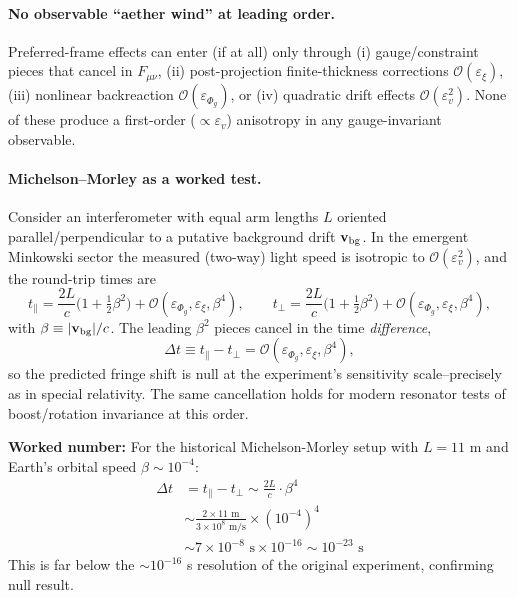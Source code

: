 \paragraph{No observable ``aether wind'' at leading order.}
Preferred-frame effects can enter (if at all) only through (i) gauge/constraint pieces that cancel in $F_{\mu\nu}$, (ii) post-projection finite-thickness corrections $\mathcal O(\varepsilon_\xi)$, (iii) nonlinear backreaction $\mathcal O(\varepsilon_{\Phi_g})$, or (iv) quadratic drift effects $\mathcal O(\varepsilon_v^2)$. None of these produce a first-order ($\propto \varepsilon_v$) anisotropy in any gauge-invariant observable.

\paragraph{Michelson–Morley as a worked test.}
Consider an interferometer with equal arm lengths $L$ oriented parallel/perpendicular to a putative background drift $\mathbf v_{\rm bg}$. In the emergent Minkowski sector the measured (two-way) light speed is isotropic to $\mathcal O(\varepsilon_v^2)$, and the round-trip times are
\begin{equation}
t_{\parallel}=\frac{2L}{c}\Big(1+\tfrac{1}{2}\beta^2\Big)+\mathcal O(\varepsilon_{\Phi_g},\varepsilon_\xi,\beta^4),\qquad
t_{\perp}=\frac{2L}{c}\Big(1+\tfrac{1}{2}\beta^2\Big)+\mathcal O(\varepsilon_{\Phi_g},\varepsilon_\xi,\beta^4),
\end{equation}
with $\beta\equiv|\mathbf v_{\rm bg}|/c$. The leading $\beta^2$ pieces cancel in the time \emph{difference},
\begin{equation}
\Delta t \equiv t_{\parallel}-t_{\perp}=\mathcal O(\varepsilon_{\Phi_g},\varepsilon_\xi,\beta^4),
\end{equation}
so the predicted fringe shift is null at the experiment's sensitivity scale--precisely as in special relativity. The same cancellation holds for modern resonator tests of boost/rotation invariance at this order.

\textbf{Worked number:} For the historical Michelson-Morley setup with $L = 11$ m and Earth's orbital speed $\beta \sim 10^{-4}$:
\begin{align*}
\Delta t &= t_{\parallel} - t_{\perp} \sim \frac{2L}{c} \cdot \beta^4 \\
&\sim \frac{2 \times 11\text{ m}}{3 \times 10^8\text{ m/s}} \times (10^{-4})^4 \\
&\sim 7 \times 10^{-8}\text{ s} \times 10^{-16} \sim 10^{-23}\text{ s}
\end{align*}
This is far below the $\sim 10^{-16}$ s resolution of the original experiment, confirming null result.


